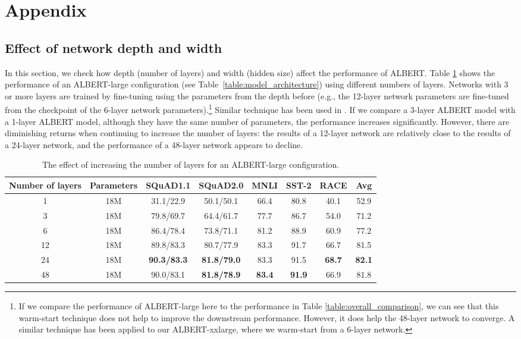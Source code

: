\section{Appendix}
\label{appendix}

\subsection{Effect of network depth and width}
\label{sec:depth-and-width}

In this section, we check how depth (number of layers) and width (hidden size) affect the performance of ALBERT.
Table \ref{table:varying-depth} shows the performance of an ALBERT-large configuration (see Table~\ref{table:model_architecture}) using different numbers of layers.
Networks with 3 or more layers are trained by fine-tuning using the parameters from the depth before (e.g., the 12-layer network parameters are fine-tuned from the checkpoint of the 6-layer network parameters).\footnote{If we compare the performance of ALBERT-large here to the performance in Table \ref{table:overall_comparison}, we can see that this warm-start technique does not help to improve the downstream performance. However, it does help the 48-layer network to converge. A similar technique has been applied to our ALBERT-xxlarge, where we warm-start from a 6-layer network.} Similar technique has been used in \cite{gong2019efficient}.
If we compare a 3-layer ALBERT model with a 1-layer ALBERT model, although they have the same number of parameters, the performance increases significantly.
However, there are diminishing returns when continuing to increase the number of layers: the results of a 12-layer network are relatively close to the results of a 24-layer network, and the performance of a 48-layer network appears to decline.

\begin{table}[!htbp] 
\small
\centering
\begin{tabular}{ c  c | c c c c c | c }
Number of layers	 & Parameters 	&SQuAD1.1	&SQuAD2.0	&MNLI	&SST-2	&RACE & Avg \\
\hline
1   &18M    &31.1/22.9	&50.1/50.1	&66.4	&80.8	&40.1   &52.9\\
3   &18M    &79.8/69.7	&64.4/61.7	&77.7	&86.7	&54.0	&71.2\\
6   &18M    &86.4/78.4	&73.8/71.1	&81.2	&88.9	&60.9	&77.2\\
12  &18M    &89.8/83.3	&80.7/77.9	&83.3	&91.7	&66.7	&81.5\\
24  &18M    &\textbf{90.3/83.3}	&\textbf{81.8/79.0}	&83.3	&91.5	&\textbf{68.7}	&\textbf{82.1}\\
48  &18M    &90.0/83.1	&\textbf{81.8/78.9}	&\textbf{83.4}	&\textbf{91.9}	&66.9	&81.8\\
\end{tabular}
\caption{The effect of increasing the number of layers for an ALBERT-large configuration.}
\label{table:varying-depth}
\end{table}

